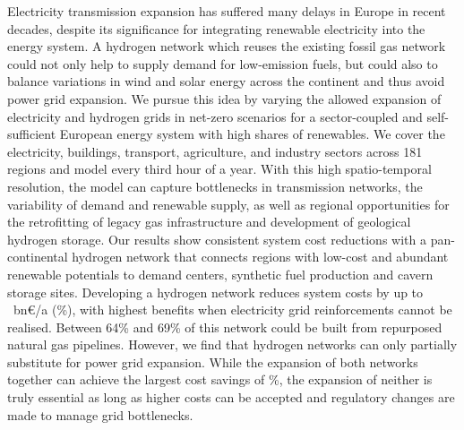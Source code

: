 Electricity transmission expansion has suffered many delays in Europe in recent
decades, despite its significance for integrating renewable electricity into the
energy system. A hydrogen network which reuses the existing fossil gas network
could not only help to supply demand for low-emission fuels, but could also to
balance variations in wind and solar energy across the continent and thus avoid
power grid expansion. We pursue this idea by varying the allowed expansion of
electricity and hydrogen grids in net-zero \co scenarios for a sector-coupled
and self-sufficient European energy system with high shares of renewables. We
cover the electricity, buildings, transport, agriculture, and industry sectors
across 181 regions and model every third hour of a year. With this high
spatio-temporal resolution, the model can capture bottlenecks in transmission
networks, the variability of demand and renewable supply, as well as regional
opportunities for the retrofitting of legacy gas infrastructure and development
of geological hydrogen storage. Our results show consistent system cost
reductions with a pan-continental hydrogen network that connects regions with
low-cost and abundant renewable potentials to demand centers, synthetic fuel
production and cavern storage sites. Developing a hydrogen network reduces
system costs by up to \maxhybenefitabs~bn\euro/a (\maxhybenefitrel\%), with
highest benefits when electricity grid reinforcements cannot be realised.
Between 64\% and 69\% of this network could be built from repurposed natural gas
pipelines. However, we find that hydrogen networks can only partially substitute
for power grid expansion. While the expansion of both networks together can
achieve the largest cost savings of \gridbenefitrel\%, the expansion of neither
is truly essential as long as higher costs can be accepted and regulatory
changes are made to manage grid bottlenecks.

